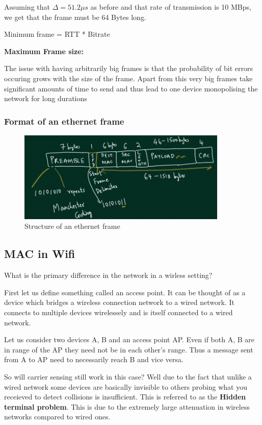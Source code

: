 \documentclass[12pt]{article}
\begin{document}
Assuming that \(\Delta = 51.2\mu s\) as before and that rate of transmission is 
10 MBps, we get that the frame must be 64 Bytes long. 


    Minimum frame = {RTT} * Bitrate


\textbf{Maximum Frame size:}

The issue with having arbitrarily big frames is that the probability of 
bit errors occuring grows with the size of the frame. Apart from this very big frames 
take significant amounts of time to send and thus lead to one device 
monopolising the network for long durations 

\subsubsection{Format of an ethernet frame}

\begin{figure}[H]
    \centering
    \includegraphics*[width=10cm]{Diagrams/ethernet_frame.png}
    \caption{Structure of an ethernet frame}
\end{figure}


\subsection{MAC in Wifi}

What is the primary difference in the network in a wirless setting? 

First let us define something called an access point. It can be thought of as a device which 
bridges a wireless connection network to a wired network. It connects to 
multiple devices wirelessely and is itself connected to a wired network. 


Let us consider two devices A, B and an access point AP. Even if both A, B are in range 
of the AP they need not be in each other's range. Thus a message sent from A to AP need to 
necessarily reach B and vice versa. 

So will carrier sensing still work in this case? Well due to the fact that unlike a wired network 
some devices are basically invisible to others probing what you receieved to detect collisions is insufficient. This is 
referred to as the \textbf{Hidden terminal problem}. This is due to the extremely large 
attenuation in wireless networks compared to wired ones.
\end{document}
